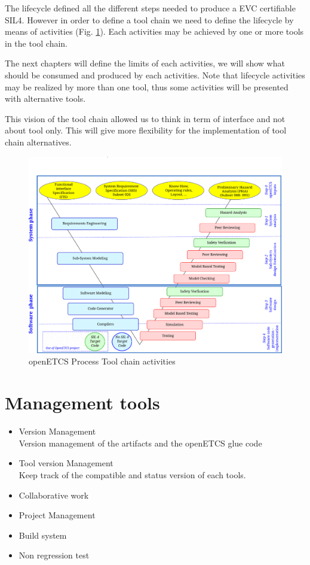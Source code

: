 The lifecycle defined all the different steps needed to produce a
\gls{EVC} certifiable SIL4. However in order to define a tool chain we
need to define the lifecycle by means of activities
(Fig. \ref{fig:openETCSActivities}). Each activities may be achieved by
one or more tools in the tool chain. 

The next chapters will define the limits of each activities, we will
show what should be consumed and produced by each activities. 
Note that lifecycle activities may be realized by more than one tool, thus some
activities will be presented with alternative tools.

This vision of the tool chain allowed us to think in term of interface
and not about tool only. This will give more flexibility for the
implementation of tool chain alternatives. 
\begin{figure}[htbp]
  \centering
  \includegraphics[width=\textwidth]{images/WholeProcess_Activities}
  \caption{openETCS Process Tool chain activities}
  \label{fig:openETCSActivities}
\end{figure}


\section{Management tools}
\begin{itemize}
\item Version Management\\
Version management of the artifacts and the openETCS glue code 
\item Tool version Management \\
Keep track of the compatible and status version of each tools. 
\item Collaborative work
\item Project  Management
\item Build system
\item Non regression test
\end{itemize}



